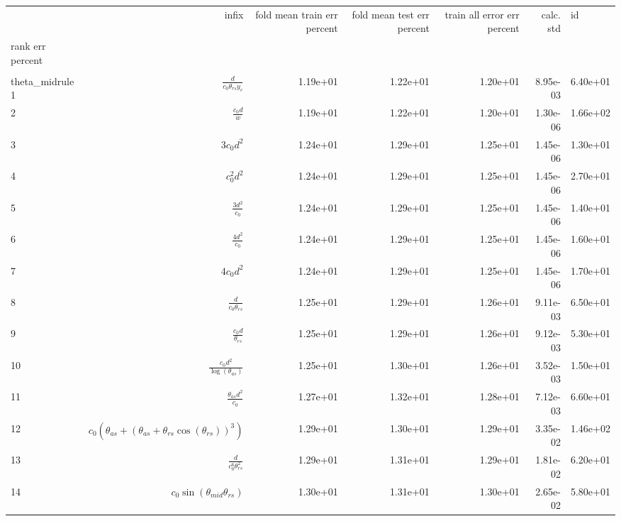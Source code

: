 \begin{tabularx}{\textwidth}{lRRRRRl}
\toprule
  &  infix  &  fold mean train err percent  &  fold mean test err percent  &  train all error err percent  &  calc. std  &  id  \\ 
rank err percent  &    &    &    &    &    &    \\ 
\\theta_{mid}rule
1  &  $ \displaystyle\frac{d}{c_{0} \theta_{rs} y_c} $  &  1.19e+01  &  1.22e+01  &  1.20e+01  &  8.95e-03  &  6.40e+01  \\ 
2  &  $ \displaystyle\frac{c_{0} d}{w} $  &  1.19e+01  &  1.22e+01  &  1.20e+01  &  1.30e-06  &  1.66e+02  \\ 
3  &  $ 3 c_{0} d^{2} $  &  1.24e+01  &  1.29e+01  &  1.25e+01  &  1.45e-06  &  1.30e+01  \\ 
4  &  $ c_{0}^{2} d^{2} $  &  1.24e+01  &  1.29e+01  &  1.25e+01  &  1.45e-06  &  2.70e+01  \\ 
5  &  $ \displaystyle\frac{3 d^{2}}{c_{0}} $  &  1.24e+01  &  1.29e+01  &  1.25e+01  &  1.45e-06  &  1.40e+01  \\ 
6  &  $ \displaystyle\frac{4 d^{2}}{c_{0}} $  &  1.24e+01  &  1.29e+01  &  1.25e+01  &  1.45e-06  &  1.60e+01  \\ 
7  &  $ 4 c_{0} d^{2} $  &  1.24e+01  &  1.29e+01  &  1.25e+01  &  1.45e-06  &  1.70e+01  \\ 
8  &  $ \displaystyle\frac{d}{c_{0} \theta_{rs}} $  &  1.25e+01  &  1.29e+01  &  1.26e+01  &  9.11e-03  &  6.50e+01  \\ 
9  &  $ \displaystyle\frac{c_{0} d}{\theta_{rs}} $  &  1.25e+01  &  1.29e+01  &  1.26e+01  &  9.12e-03  &  5.30e+01  \\ 
10  &  $ \displaystyle\frac{c_{0} d^{2}}{\log{\left(\theta_{as} \right)}} $  &  1.25e+01  &  1.30e+01  &  1.26e+01  &  3.52e-03  &  1.50e+01  \\ 
11  &  $ \displaystyle\frac{\theta_{as} d^{2}}{c_{0}} $  &  1.27e+01  &  1.32e+01  &  1.28e+01  &  7.12e-03  &  6.60e+01  \\ 
12  &  $ c_{0} \left(\theta_{as} + \left(\theta_{as} + \theta_{rs} \cos{\left(\theta_{rs} \right)}\right)^{3}\right) $  &  1.29e+01  &  1.30e+01  &  1.29e+01  &  3.35e-02  &  1.46e+02  \\ 
13  &  $ \displaystyle\frac{d}{c_{0}^{6} \theta_{rs}^{2}} $  &  1.29e+01  &  1.31e+01  &  1.29e+01  &  1.81e-02  &  6.20e+01  \\ 
14  &  $ c_{0} \sin{\left(\theta_{mid} \theta_{rs} \right)} $  &  1.30e+01  &  1.31e+01  &  1.30e+01  &  2.65e-02  &  5.80e+01  \\ 

\end{tabularx}
